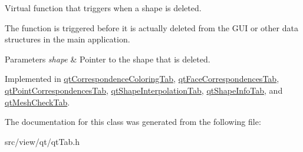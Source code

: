 Virtual function that triggers when a shape is deleted. 

The function is triggered before it is actually deleted from the G\+U\+I or other data structures in the main application. 
\begin{DoxyParams}{Parameters}
{\em shape} & Pointer to the shape that is deleted. \\
\hline
\end{DoxyParams}


Implemented in \hyperlink{classqt_correspondence_coloring_tab_a731f7da293d21c87059515a10d36d1e3}{qt\+Correspondence\+Coloring\+Tab}, \hyperlink{classqt_face_correspondences_tab_a6e921225a7049a72fe4b24c355892160}{qt\+Face\+Correspondences\+Tab}, \hyperlink{classqt_point_correspondences_tab_a3fd3d809d1686a5397befe85feeac399}{qt\+Point\+Correspondences\+Tab}, \hyperlink{classqt_shape_interpolation_tab_aac6776b2f521abe2d9aa6f932665cf57}{qt\+Shape\+Interpolation\+Tab}, \hyperlink{classqt_shape_info_tab_a295e58538f2cebdfd9a4b5b40bf1e16c}{qt\+Shape\+Info\+Tab}, and \hyperlink{classqt_mesh_check_tab_aa1f583fbc0604f8c34528efd581e0633}{qt\+Mesh\+Check\+Tab}.



The documentation for this class was generated from the following file\+:\begin{DoxyCompactItemize}
\item 
src/view/qt/qt\+Tab.\+h\end{DoxyCompactItemize}
